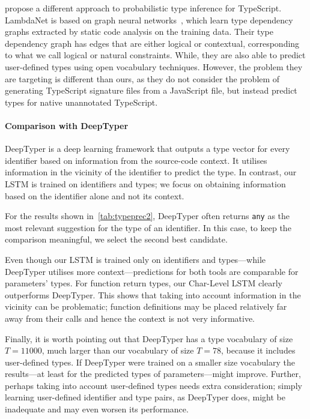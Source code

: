 \documentclass[acmsmall, review, anonymous]{acmart}\settopmatter{printfolios=true,printccs=false,printacmref=false}
\newcommand{\margincomment}[2]{\marginpar{\scriptsize\color{Maroon}#1 says: #2}}
\newcommand{\adg}[1]{\margincomment{ADG}{#1}}
\begin{document}
\citet{wei20} propose a different approach to probabilistic type inference for TypeScript. LambdaNet is 
based on graph neural networks~\citep{allamanis17a}, which learn type dependency graphs extracted by static 
code analysis on the training data. Their type dependency graph has edges that are either logical or contextual, corresponding to what we call logical or natural constraints.
While, they are also able to predict user-defined types using open vocabulary techniques. However, the problem they
are targeting is different than ours, as they do not consider the problem of generating TypeScript signature files from a JavaScript file, but instead predict types for native unannotated TypeScript.

\paragraph{Comparison with DeepTyper}
DeepTyper is a deep learning framework that outputs a type vector for every identifier
based on information from the source-code context.
It utilises information in the vicinity of the identifier to predict the type.
In contrast, our LSTM is trained on identifiers and types;
we focus on obtaining information based on the identifier alone and not its context.

For the results shown in~\cref{tab:typeprec2},
DeepTyper often returns \lstinline{any} as the most relevant suggestion for the type of an identifier.
In this case, to keep the comparison meaningful, we select the second best candidate.

Even though our LSTM is trained only on identifiers and types---while
DeepTyper utilises more context---predictions for both tools are comparable for parameters' types.
For function return types, our Char-Level LSTM clearly outperforms DeepTyper.
This shows that taking into account information in the vicinity can be problematic;
function definitions may be placed relatively far away from their calls
and hence the context is not very informative.

Finally, it is worth pointing out that DeepTyper has a type vocabulary of size $T = 11000$,
much larger than our vocabulary of size $T=78$,
because it includes user-defined types.
If DeepTyper were trained on a smaller size vocabulary the results---at least for the predicted
types of parameters---might improve.
Further, perhaps taking into account user-defined types needs extra consideration;
simply learning user-defined identifier and type pairs, as DeepTyper does, might
be inadequate and may even worsen its performance.
\end{document}
